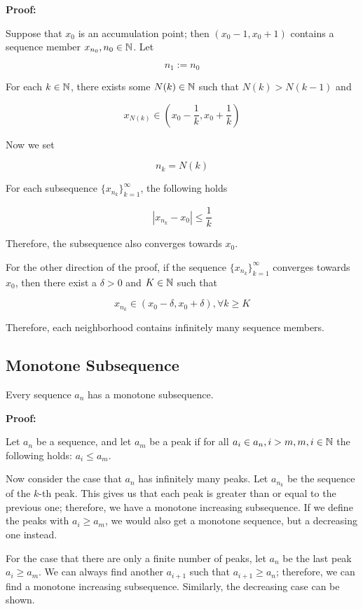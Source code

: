 \textbf{Proof:}

Suppose that \(x_0\) is an accumulation point; then \((x_0 - 1, x_0 + 1)\) contains a sequence member \(x_{n_0}, n_0 \in \mathbb{N}\).
Let

\[
	n_1 := n_0
\]

For each \(k \in \mathbb{N}\), there exists some \(N(k) \in \mathbb{N}\) such that \(N(k) > N(k - 1)\)
and

\[
	x_{N(k)} \in  (x_0 - \frac{1}{k}, x_0 + \frac{1}{k})
\]

Now we set

\[
	n_k = N(k)
\]

For each subsequence \(\{x_{n_k}\}_{k = 1}^{\infty}\), the following holds

\[
	|x_{n_k} - x_0 | \le \frac{1}{k}
\]

Therefore, the subsequence also converges towards \(x_0\).

For the other direction of the proof, if the sequence \(\{x_{n_k}\}_{k = 1}^{\infty}\) converges towards \(x_0\), then there exist a \(\delta > 0\) and \(K \in \mathbb{N}\)
such that

\[
	x_{n_k} \in (x_0 - \delta, x_0 + \delta), \forall k \ge K
\]

Therefore, each neighborhood contains infinitely many sequence members.

\QED

\subsection{Monotone Subsequence}

Every sequence \(a_n\) has a monotone subsequence.

\textbf{Proof:}

Let \(a_n\) be a sequence, and let \(a_m\) be a peak if for all \(a_i \in a_n, i > m, m, i \in \mathbb{N}\) the following holds: \(a_i \le a_m\).

Now consider the case that \(a_n\) has infinitely many peaks. Let \(a_{n_k}\) be the sequence of the \(k\)-th peak. This gives us that
each peak is greater than or equal to the previous one; therefore, we have a monotone increasing subsequence. If we define the peaks with \(a_i \ge a_m\), we would also
get a monotone sequence, but a decreasing one instead.

For the case that there are only a finite number of peaks, let \(a_n\) be the last peak \(a_i \ge a_m\). We can always find another \(a_{i + 1}\) such
that \(a_{i + 1} \ge a_n\); therefore, we can find a monotone increasing subsequence. Similarly, the decreasing case can be shown.

